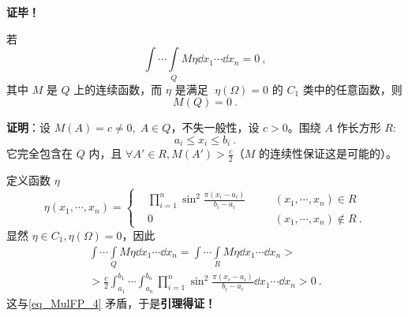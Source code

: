 \textbf{证毕！}

\begin{lemma}{}
若
\begin{equation}\label{eq_MulFP_4}
\int\cdots\int\limits_Q M\eta\dd x_1\cdots\dd x_n=0~,
\end{equation}
其中 $M$ 是 $Q$ 上的连续函数，而 $\eta$ 是满足 $\;\eta(\Omega)=0$  的 $C_1$ 类中的任意函数，则
\begin{equation}
M(Q)=0~.
\end{equation}
\end{lemma}
  \textbf{证明}：设 $M(A)=c\neq0,\;A\in Q$，不失一般性，设 $c>0$。围绕 $A$ 作长方形 $R$:
  \begin{equation}
  a_i\leq x_i\leq b_i~.
  \end{equation}
  它完全包含在 $Q$ 内，且 $\forall A'\in R,M(A')>\frac{c}{2}$（$M$ 的连续性保证这是可能的）。

  定义函数 $\eta$
  \begin{equation}
  \eta(x_1,\cdots,x_n)=\left\{
      \begin{aligned}
      &\prod_{i=1}^n \sin^2\frac{\pi(x_i-a_i)}{b_i-a_i} &\quad &(x_1,\cdots,x_n)\in R\\
      &0 &\quad &(x_1,\cdots,x_n)\notin R~.
      \end{aligned}\right.
  \end{equation}
  显然 $\eta\in C_1,\eta(\Omega)=0$，因此
  \begin{equation}
  \begin{aligned}
  \int\cdots\int\limits_Q M\eta\dd x_1\cdots\dd x_n=\int\cdots\int\limits_R M\eta\dd x_1\cdots\dd x_n>\\
  >\frac{c}{2}\int_{a_1}^{b_1}\cdots\int_{a_n}^{b_n}\prod_{i=1}^n \sin^2\frac{\pi(x_i-a_i)}{b_i-a_i}\dd x_1\cdots\dd x_n>0~.
  \end{aligned}
  \end{equation}
  这与\autoref{eq_MulFP_4} 矛盾，于是\textbf{引理得证！}
